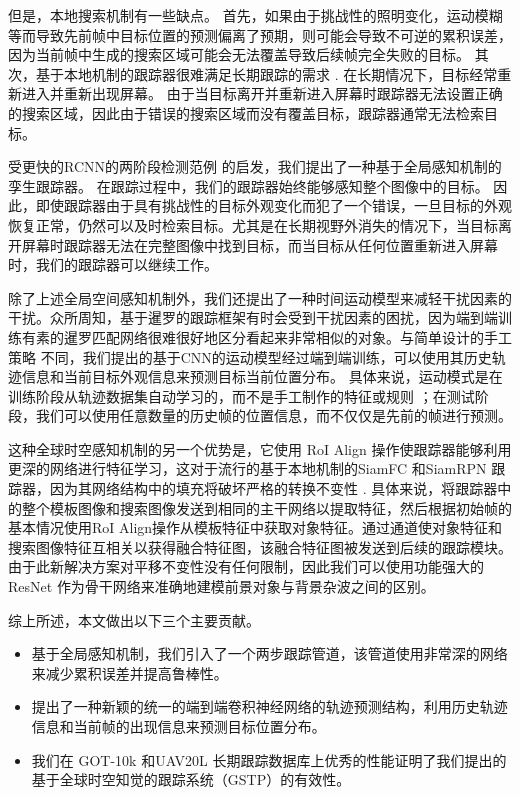 但是，本地搜索机制有一些缺点。
首先，如果由于挑战性的照明变化，运动模糊等而导致先前帧中目标位置的预测偏离了预期，则可能会导致不可逆的累积误差，因为当前帧中生成的搜索区域可能会无法覆盖导致后续帧完全失败的目标。
其次，基于本地机制的跟踪器很难满足长期跟踪的需求 \cite{kalal2011tracking, hong2015multi}.
在长期情况下，目标经常重新进入并重新出现屏幕。
由于当目标离开并重新进入屏幕时跟踪器无法设置正确的搜索区域，因此由于错误的搜索区域而没有覆盖目标，跟踪器通常无法检索目标。

受更快的RCNN的两阶段检测范例 \cite{ren2015faster}的启发，我们提出了一种基于全局感知机制的孪生跟踪器。
在跟踪过程中，我们的跟踪器始终能够感知整个图像中的目标。
因此，即使跟踪器由于具有挑战性的目标外观变化而犯了一个错误，一旦目标的外观恢复正常，仍然可以及时检索目标。尤其是在长期视野外消失的情况下，当目标离开屏幕时跟踪器无法在完整图像中找到目标，而当目标从任何位置重新进入屏幕时，我们的跟踪器可以继续工作。

除了上述全局空间感知机制外，我们还提出了一种时间运动模型来减轻干扰因素的干扰。众所周知，基于暹罗的跟踪框架有时会受到干扰因素的困扰，因为端到端训练有素的暹罗匹配网络很难很好地区分看起来非常相似的对象。与简单设计的手工策略 \cite{SiamFC, SiamRPN}不同，我们提出的基于CNN的运动模型经过端到端训练，可以使用其历史轨迹信息和当前目标外观信息来预测目标当前位置分布。
具体来说，运动模式是在训练阶段从轨迹数据集自动学习的，而不是手工制作的特征或规则 \cite{iswanto2017visual}；在测试阶段，我们可以使用任意数量的历史帧的位置信息，而不仅仅是先前的帧进行预测。

这种全球时空感知机制的另一个优势是，它使用 RoI Align \cite{He2018MaskR} 操作使跟踪器能够利用更深的网络进行特征学习，这对于流行的基于本地机制的SiamFC \cite{SiamFC} 和SiamRPN \cite{SiamRPN} 跟踪器，因为其网络结构中的填充将破坏严格的转换不变性 \cite{SiamRPN++}. 具体来说，将跟踪器中的整个模板图像和搜索图像发送到相同的主干网络以提取特征，然后根据初始帧的基本情况使用RoI Align操作从模板特征中获取对象特征。通过通道使对象特征和搜索图像特征互相关以获得融合特征图，该融合特征图被发送到后续的跟踪模块。由于此新解决方案对平移不变性没有任何限制，因此我们可以使用功能强大的ResNet \cite{he2016deep} 作为骨干网络来准确地建模前景对象与背景杂波之间的区别。

综上所述，本文做出以下三个主要贡献。
\begin{itemize}
\item 基于全局感知机制，我们引入了一个两步跟踪管道，该管道使用非常深的网络来减少累积误差并提高鲁棒性。
\item 提出了一种新颖的统一的端到端卷积神经网络的轨迹预测结构，利用历史轨迹信息和当前帧的出现信息来预测目标位置分布。
\item 我们在 GOT-10k \cite{GOT-10k} 和UAV20L \cite{mueller2016benchmark} 长期跟踪数据库上优秀的性能证明了我们提出的基于全球时空知觉的跟踪系统（GSTP）的有效性。
\end{itemize}

